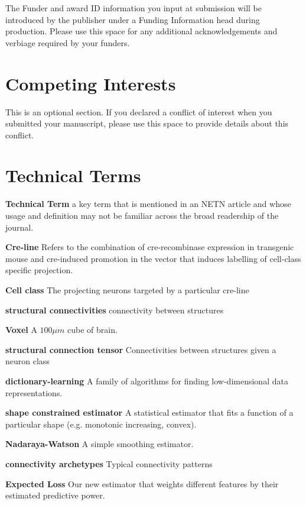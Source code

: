 \documentclass[NETN,manuscript]{stjour-new}
\begin{document}
\newpage

\acknowledgments
The Funder and award ID information you input at submission will be introduced by the publisher under a Funding Information head during production.
Please use this space for any additional acknowledgements and verbiage required by your funders.
\newpage


\newpage
\section{Competing Interests}
\label{sec:comp}
This is an optional section. If you declared a conflict of interest when you submitted your manuscript, please  use this space to provide details about this conflict.

\newpage


\newpage
\section{Technical Terms}

\textbf{Technical Term} a key term that is mentioned in an NETN article and whose usage and definition may not be familiar across the broad readership of the journal. 


\textbf{Cre-line}  Refers to the combination of cre-recombinase expression in transgenic mouse and cre-induced promotion in the vector that induces labelling of cell-class specific projection. 

\textbf{Cell class} The projecting neurons targeted by a particular cre-line 

\textbf{structural connectivities}  connectivity between structures 

\textbf{Voxel} A $100 \mu m$ cube of brain. 

\textbf{structural connection tensor}  Connectivities between structures given a neuron class

\textbf{dictionary-learning} A family of algorithms for finding low-dimensional data representations.

\textbf{shape constrained estimator} A statistical estimator that fits a function of a particular shape (e.g. monotonic increasing, convex).

\textbf{Nadaraya-Watson} A simple smoothing estimator.

\textbf{connectivity archetypes} Typical connectivity patterns

 \textbf{Expected Loss} Our new estimator that weights different features by their estimated predictive power.
 
\end{document}
